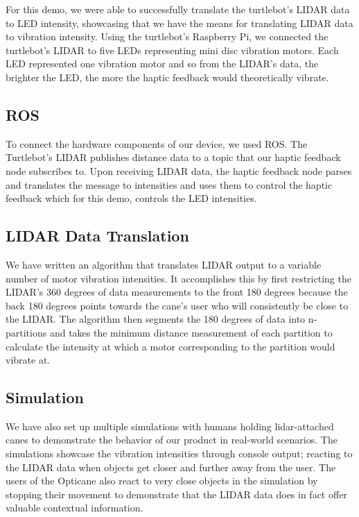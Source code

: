 \documentclass{article}
\begin{document}
For this demo, we were able to successfully translate the turtlebot's LIDAR data to LED intensity, showcasing that we have the means for translating LIDAR data to vibration intensity. Using the turtlebot's Raspberry Pi, we connected the turtlebot's LIDAR to five LEDs representing mini disc vibration motors. Each LED represented one vibration motor and so from the LIDAR's data, the brighter the LED, the more the haptic feedback would theoretically vibrate.

\subsection{ROS}

To connect the hardware components of our device, we used ROS. The Turtlebot's LIDAR publishes distance data to a topic that our haptic feedback node subscribes to. Upon receiving LIDAR data, the haptic feedback node parses and translates the message to intensities and uses them to control the haptic feedback which for this demo, controls the LED intensities.

\subsection{LIDAR Data Translation}

We have written an algorithm that translates LIDAR output to a variable number of motor vibration intensities. It accomplishes this by first restricting the LIDAR's 360 degrees of data measurements to the front 180 degrees because the back 180 degrees points towards the cane's user who will consistently be close to the LIDAR. The algorithm then segments the 180 degrees of data into n-partitions and takes the minimum distance measurement of each partition to calculate the intensity at which a motor corresponding to the partition would vibrate at.

\subsection{Simulation}

We have also set up multiple simulations with humans holding lidar-attached canes to demonstrate the behavior of our product in real-world scenarios. The simulations showcase the vibration intensities through console output; reacting to the LIDAR data when objects get closer and further away from the user. The users of the Opticane also react to very close objects in the simulation by stopping their movement to demonstrate that the LIDAR data does in fact offer valuable contextual information.
\end{document}
